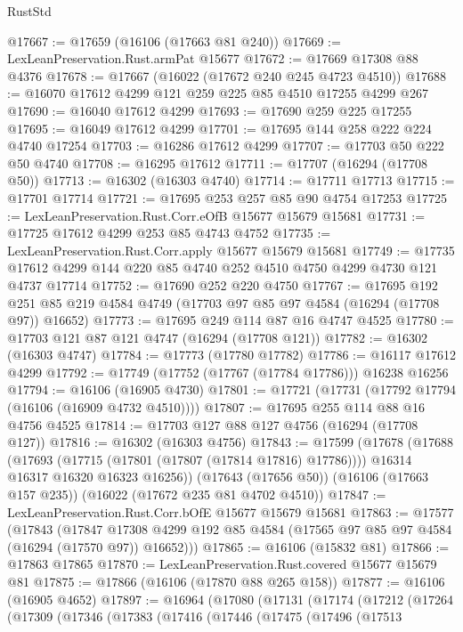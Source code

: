 \begin{lexlean}{RustStd}
\begin{coremodule}
@17667 := @17659 (@16106 (@17663 @81 @240))
@17669 := LexLeanPreservation.Rust.armPat @15677
@17672 := @17669 @17308 @88 @4376
@17678 := @17667 (@16022 (@17672 @240 @245 @4723 @4510))
@17688 := @16070 @17612 @4299 @121 @259 @225 @85 @4510 @17255 @4299 @267
@17690 := @16040 @17612 @4299
@17693 := @17690 @259 @225 @17255
@17695 := @16049 @17612 @4299
@17701 := @17695 @144 @258 @222 @224 @4740 @17254
@17703 := @16286 @17612 @4299
@17707 := @17703 @50 @222 @50 @4740
@17708 := @16295 @17612
@17711 := @17707 (@16294 (@17708 @50))
@17713 := @16302 (@16303 @4740)
@17714 := @17711 @17713
@17715 := @17701 @17714
@17721 := @17695 @253 @257 @85 @90 @4754 @17253
@17725 := LexLeanPreservation.Rust.Corr.eOfB @15677 @15679 @15681
@17731 := @17725 @17612 @4299 @253 @85 @4743 @4752
@17735 := LexLeanPreservation.Rust.Corr.apply @15677 @15679 @15681
@17749 := @17735 @17612 @4299 @144 @220 @85 @4740 @252 @4510 @4750 @4299 @4730 @121 @4737 @17714
@17752 := @17690 @252 @220 @4750
@17767 := @17695
    @192
    @251
    @85
    @219
    @4584
    @4749
    (@17703 @97 @85 @97 @4584 (@16294 (@17708 @97)) @16652)
@17773 := @17695 @249 @114 @87 @16 @4747 @4525
@17780 := @17703 @121 @87 @121 @4747 (@16294 (@17708 @121))
@17782 := @16302 (@16303 @4747)
@17784 := @17773 (@17780 @17782)
@17786 := @16117 @17612 @4299
@17792 := @17749 (@17752 (@17767 (@17784 @17786))) @16238 @16256
@17794 := @16106 (@16905 @4730)
@17801 := @17721 (@17731 (@17792 @17794 (@16106 (@16909 @4732 @4510))))
@17807 := @17695 @255 @114 @88 @16 @4756 @4525
@17814 := @17703 @127 @88 @127 @4756 (@16294 (@17708 @127))
@17816 := @16302 (@16303 @4756)
@17843 := @17599
    (@17678
      (@17688
        (@17693 (@17715 (@17801 (@17807 (@17814 @17816) @17786))))
        @16314
        @16317
        @16320
        @16323
        @16256))
    (@17643 (@17656 @50))
    (@16106 (@17663 @157 @235))
    (@16022 (@17672 @235 @81 @4702 @4510))
@17847 := LexLeanPreservation.Rust.Corr.bOfE @15677 @15679 @15681
@17863 := @17577
    (@17843
      (@17847 @17308 @4299 @192 @85 @4584 (@17565 @97 @85 @97 @4584 (@16294 (@17570 @97)) @16652)))
@17865 := @16106 (@15832 @81)
@17866 := @17863 @17865
@17870 := LexLeanPreservation.Rust.covered @15677 @15679 @81
@17875 := @17866 (@16106 (@17870 @88 @265 @158))
@17877 := @16106 (@16905 @4652)
@17897 := @16964
    (@17080
      (@17131
        (@17174
          (@17212
            (@17264
              (@17309
                (@17346
                  (@17383
                    (@17416
                      (@17446
                        (@17475
                          (@17496
                            (@17513

\end{coremodule}
\end{lexlean}
